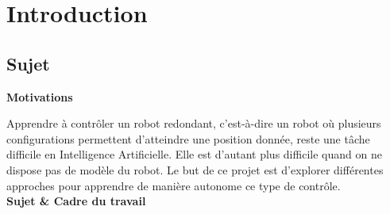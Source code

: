 \documentclass[11pt,french]{report}
\begin{document}




\chapter{Introduction}
\section{Sujet}

\noindent\textbf{Motivations}

Apprendre à contrôler un robot redondant, c’est-à-dire un robot où plusieurs configurations permettent d’atteindre une position donnée, reste une tâche difficile en Intelligence Artificielle. Elle est d’autant plus difficile quand on ne dispose pas de modèle du robot. Le but de ce projet est d’explorer différentes approches pour apprendre de manière autonome ce type de contrôle.\\[10pt]
\noindent\textbf{Sujet \& Cadre du travail}
\end{document}
